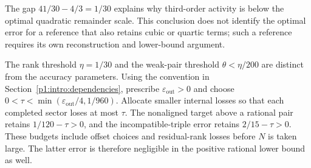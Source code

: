 The gap $41/30-4/3=1/30$ explains why third-order activity is below
the optimal quadratic remainder scale.  This conclusion does not
identify the optimal error for a reference that also retains cubic or
quartic terms; such a reference requires its own reconstruction and
lower-bound argument.

The rank threshold $\eta=1/30$ and the weak-pair threshold
$\theta<\eta/200$ are distinct from the accuracy parameters.
Using the convention in Section~\ref{p1:intro:dependencies}, prescribe
$\varepsilon_{\mathrm{out}}>0$ and choose
$0<\tau<\min(\varepsilon_{\mathrm{out}}/4,1/960)$.
Allocate smaller internal losses so that each completed sector loses
at most $\tau$. The nonaligned target above a rational pair retains
$1/120-\tau>0$, and the incompatible-triple error retains
$2/15-\tau>0$. These budgets include offset choices and residual-rank
losses before $N$ is taken large. The latter error is therefore
negligible in the positive rational lower bound as well.

